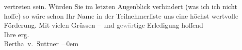                    vertreten sein.\pend
           \pstart
           Würden Sie im letzten Augenblick verhindert (was ich ich nicht hoffe) so wäre
                    schon Ihr Name in der Teilnehmerliste uns eine höchst wertvolle Förderung.\pend
           \pstart
           Mit vielen Grüssen – und g\textcolor{gray}{ewär}tige Erledigung
                    hoffend{\\[\baselineskip]}Ihre erg.{\\[\baselineskip]}\spacefill\mbox{Bertha v. Suttner}\pend
           \leftskip=0em{}\endnumbering{}  
      
